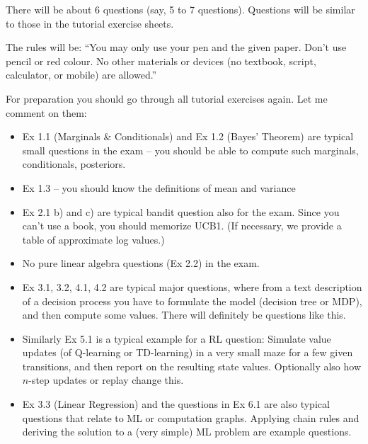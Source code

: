 

\renewcommand{\course}{Artificial Intelligence}
\renewcommand{\coursepicture}{course_ai}
\renewcommand{\coursedate}{Summer 2023}

\renewcommand{\exnum}{Exercise 7 -- Exam Preparation}

\newcommand{\BOX}[3][]{\fbox{\begin{minipage}[c]{#2}\vspace{#3}\centerline{#1}\vspace{#3}\end{minipage}}}

\exercises
{}
\exercisestitle



There will be about 6 questions (say, 5 to 7 questions). Questions will be  similar to those in the tutorial exercise sheets.

The rules will be: ``You may only use your pen and the given
paper. Don't use pencil or red colour. No other materials or devices
(no textbook, script, calculator, or mobile) are allowed.''

For preparation you should go through all tutorial exercises again. Let me comment on them:
\begin{itemize}
\item Ex 1.1 (Marginals \& Conditionals) and Ex 1.2 (Bayes' Theorem) are typical small questions in the exam -- you should be able to compute such marginals, conditionals, posteriors.
\item Ex 1.3 -- you should know the definitions of mean and variance

\item Ex 2.1 b) and c) are typical bandit question also for the exam. Since you can't use a book, you should memorize UCB1. (If necessary, we provide a table of approximate log values.)

\item No pure linear algebra questions (Ex 2.2) in the exam.

\item Ex 3.1, 3.2, 4.1, 4.2 are typical major questions, where from a text description of a decision process you have to formulate the model (decision tree or MDP), and then compute some values. There will definitely be questions like this.

\item Similarly Ex 5.1 is a typical example for a RL question: Simulate value updates (of Q-learning or TD-learning) in a very small maze for a few given transitions, and then report on the resulting state values. Optionally also how $n$-step updates or replay change this.

\item Ex 3.3 (Linear Regression) and the questions in Ex 6.1 are also typical questions that relate to ML or computation graphs. Applying chain rules and deriving the solution to a (very simple) ML problem are example questions.
\end{itemize}


